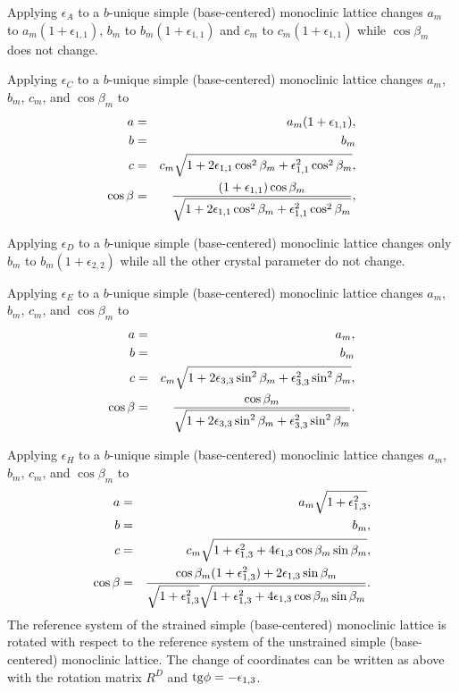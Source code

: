 \documentclass[12pt,a4paper]{article}
\begin{document}
Applying $\epsilon_A$ to a $b$-unique simple (base-centered) monoclinic 
lattice changes
$a_m$ to $a_m(1+\epsilon_{1,1})$, $b_m$ to $b_m(1+\epsilon_{1,1})$
and $c_m$ to $c_m(1+\epsilon_{1,1})$ while $\cos \beta_m$
does not change.

Applying $\epsilon_C$ to a $b$-unique simple (base-centered) monoclinic lattice 
changes $a_m$, $b_m$, $c_m$, and $\cos \beta_m$ to 
\begin{eqnarray}
a&=&a_m(1+\epsilon_{1,1}), \\
b&=&b_m \\
c&=&c_m \sqrt{1+2 \epsilon_{1,1}\cos^2\beta_m
+\epsilon_{1,1}^2 \cos^2\beta_m}, \\
\cos\beta &=& {(1+\epsilon_{1,1}) \cos\beta_m \over 
\sqrt{1+2 \epsilon_{1,1}\cos^2\beta_m
+\epsilon_{1,1}^2 \cos^2\beta_m}},
\end{eqnarray}

Applying $\epsilon_D$ to a $b$-unique simple (base-centered) monoclinic 
lattice changes
only $b_m$ to $b_m(1+\epsilon_{2,2})$ while all the other crystal
parameter do not change.

Applying $\epsilon_E$ to a $b$-unique simple (base-centered) monoclinic lattice 
changes $a_m$, $b_m$, $c_m$, and $\cos \beta_m$ to 
\begin{eqnarray}
a&=&a_m, \\
b&=&b_m \\
c&=&c_m \sqrt{1+2 \epsilon_{3,3}\sin^2\beta_m
+\epsilon_{3,3}^2 \sin^2\beta_m}, \\
\cos\beta &=& {\cos\beta_m \over \sqrt{1+2 \epsilon_{3,3}\sin^2\beta_m
+\epsilon_{3,3}^2 \sin^2\beta_m}}.
\end{eqnarray}

Applying $\epsilon_H$ to a $b$-unique simple (base-centered) monoclinic lattice 
changes $a_m$, $b_m$, $c_m$, and $\cos \beta_m$ to 
\begin{eqnarray}
a&=&a_m \sqrt{1+\epsilon_{1,3}^2}, \\
b&=&b_m, \\
c&=&c_m \sqrt{1+\epsilon_{1,3}^2
+4\epsilon_{1,3} \cos\beta_m \sin\beta_m}, \\
\cos\beta &=& {\cos\beta_m (1+\epsilon_{1,3}^2) + 2 \epsilon_{1,3} 
\sin \beta_m \over \sqrt{1+\epsilon_{1,3}^2}
\sqrt{1+\epsilon_{1,3}^2+4\epsilon_{1,3} \cos\beta_m \sin\beta_m}}.
\end{eqnarray}
The reference system of the strained simple (base-centered) monoclinic 
lattice is rotated 
with respect to the reference system of the unstrained simple 
(base-centered) monoclinic lattice. 
The change of coordinates can be written as above with the rotation matrix 
$R^D$ and ${\rm tg}\phi=-\epsilon_{1,3}$.
\end{document}
